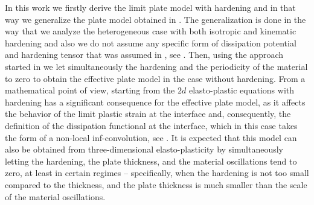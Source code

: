 \documentclass[reqno,10pt]{amsart}
\numberwithin{equation}{section}
\theoremstyle{remark}
\newcommand{\RED}{\color{black}}
\newcommand{\BLACK}{\color{black}}
\newcommand{\PINK}{\color{black}}
\begin{document}
In this work we firstly derive the limit plate model with hardening and in that way we generalize the plate model obtained in \cite{Liero.Roche.2012}.
The generalization is done in the way that we analyze the heterogeneous case with both isotropic and kinematic hardening and also we {\RED do not\BLACK} assume any specific form of dissipation potential and hardening tensor that was assumed in \cite{Liero.Mielke.2011}, see .
Then, using the approach started in \cite{Buzancic.Davoli.Velcic.2024.1st} we let simultaneously the hardening and the periodicity of the material to zero to obtain the effective plate model in the case without hardening.
From a mathematical point of view, starting from the $2d$ elasto-plastic equations with hardening has a significant consequence for the effective plate model, as it affects the behavior of the limit plastic strain at the interface and, consequently, the definition of the dissipation functional at the interface, which in this case takes the form of a non-local inf-convolution{\PINK,\BLACK} see .
It is expected that this model can also be obtained from three-dimensional elasto-plasticity by simultaneously letting the hardening, the plate thickness, and the material oscillations tend to zero, at least in certain regimes -- specifically, when the hardening is not too small compared to the thickness, and the plate thickness is much smaller than the scale of the material oscillations.
\end{document}
